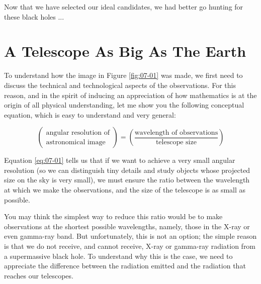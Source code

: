 Now that we have selected our ideal candidates, we had better go hunting for these black
holes ...

\section{A Telescope As Big As The Earth}\label{sec:07-telescope}

To understand how the image in Figure \ref{fig:07-01} was made, we first need to discuss the
technical and technological aspects of the observations. For this reason, and in the
spirit of inducing an appreciation of how mathematics is at the origin of all physical
understanding, let me show you the following conceptual equation, which is easy to
understand and very general:

\begin{equation}\label{eq:07-01}
\begin{pmatrix}\text{angular resolution of} \\ \text{astronomical image}\end{pmatrix}
=\left(\frac{\text{wavelength of observations}}{\text{telescope size}}\right)
\end{equation}


Equation \eqref{eq:07-01} tells us that if we want to achieve a very small angular
resolution (so we can distinguish tiny details and study objects
whose projected size on the sky is very small), we must ensure the ratio between the
wavelength at which we make the observations, and the size of the telescope is as small
as possible.

You may think the simplest way to reduce this ratio would be to make observations at the
shortest possible wavelengths, namely, those in the X-ray or even
gamma-ray band. But unfortunately, this is not an
option; the simple reason is that we do not receive, and cannot receive,
X-ray or gamma-ray radiation from a supermassive black hole. To
understand why this is the case, we need to appreciate the difference between the
radiation emitted and the radiation that reaches our telescopes.

